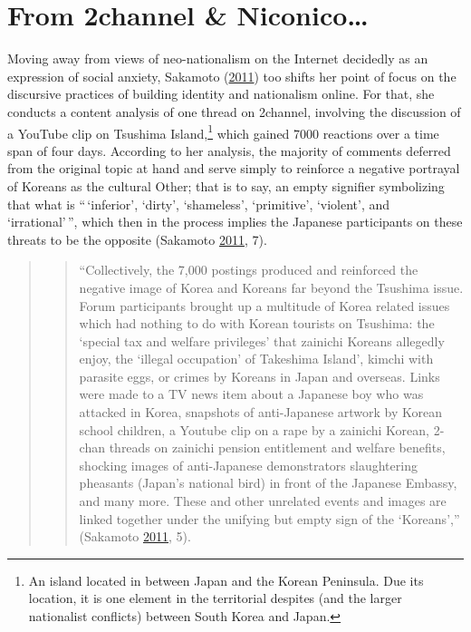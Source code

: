 \documentclass[10pt,british,A4paper,,openany]{memoir}
\begin{document}
\section{From 2channel \&
Niconico\ldots{}}\label{from-2channel-niconico}

Moving away from views of neo-nationalism on the Internet decidedly as
an expression of social anxiety, Sakamoto
(\protect\hyperlink{ref-sakamoto_koreans_2011}{2011}) too shifts her
point of focus on the discursive practices of building identity and
nationalism online. For that, she conducts a content analysis of one
thread on 2channel, involving the discussion of a YouTube clip on
Tsushima Island,\footnote{An island located in between Japan and the
  Korean Peninsula. Due its location, it is one element in the
  territorial despites (and the larger nationalist conflicts) between
  South Korea and Japan.} which gained 7000 reactions over a time span
of four days. According to her analysis, the majority of comments
deferred from the original topic at hand and serve simply to reinforce a
negative portrayal of Koreans as the cultural Other; that is to say, an
empty signifier symbolizing that what is ``\,`inferior', `dirty',
`shameless', `primitive', `violent', and `irrational'\,'', which then in
the process implies the Japanese participants on these threats to be the
opposite (Sakamoto \protect\hyperlink{ref-sakamoto_koreans_2011}{2011},
7).

\begin{quote}
\begin{quote}
``Collectively, the 7,000 postings produced and reinforced the negative
image of Korea and Koreans far beyond the Tsushima issue. Forum
participants brought up a multitude of Korea related issues which had
nothing to do with Korean tourists on Tsushima: the `special tax and
welfare privileges' that zainichi Koreans allegedly enjoy, the `illegal
occupation' of Takeshima Island', kimchi with parasite eggs, or crimes
by Koreans in Japan and overseas. Links were made to a TV news item
about a Japanese boy who was attacked in Korea, snapshots of
anti-Japanese artwork by Korean school children, a Youtube clip on a
rape by a zainichi Korean, 2-chan threads on zainichi pension
entitlement and welfare benefits, shocking images of anti-Japanese
demonstrators slaughtering pheasants (Japan's national bird) in front of
the Japanese Embassy, and many more. These and other unrelated events
and images are linked together under the unifying but empty sign of the
`Koreans','' (Sakamoto
\protect\hyperlink{ref-sakamoto_koreans_2011}{2011}, 5).
\end{quote}
\end{quote}
\end{document}
